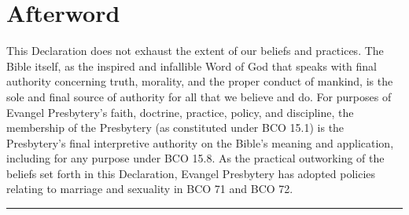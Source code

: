 \documentclass[
]{book}
\begin{document}
\hypertarget{afterword}{%
\section*{Afterword}\label{afterword}}

This Declaration does not exhaust the extent of our beliefs and practices. The Bible itself, as the inspired and infallible Word of God that speaks with final authority concerning truth, morality, and the proper conduct of mankind, is the sole and final source of authority for all that we believe and do. For purposes of Evangel Presbytery's faith, doctrine, practice, policy, and discipline, the membership of the Presbytery (as constituted under BCO 15.1) is the Presbytery's final interpretive authority on the Bible's meaning and application, including for any purpose under BCO 15.8. As the practical outworking of the beliefs set forth in this Declaration, Evangel Presbytery has adopted policies relating to marriage and sexuality in BCO 71 and BCO 72.

\begin{center}\rule{0.5\linewidth}{0.5pt}\end{center}
\end{document}
